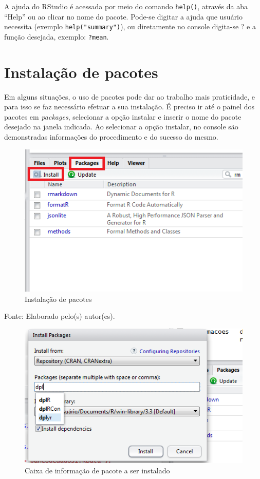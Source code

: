 \documentclass[12pt,brazil,oneside]{book}
\begin{document}
A ajuda do RStudio é acessada por meio do comando \texttt{help()}, através da aba ``Help'' ou ao clicar no nome do pacote. Pode-se digitar a ajuda que usuário necessita (exemplo \texttt{help("summary")}), ou diretamente no console digita-se ? e a função desejada, exemplo: \texttt{?mean}.

\hypertarget{instalacao-de-pacotes}{%
\section{Instalação de pacotes}\label{instalacao-de-pacotes}}

Em alguns situações, o uso de pacotes pode dar ao trabalho mais praticidade, e para isso se faz necessário efetuar a sua instalação. É preciso ir até o painel dos pacotes em \emph{packages}, selecionar a opção instalar e inserir o nome do pacote desejado na janela indicada. Ao selecionar a opção instalar, no console são demonstradas informações do procedimento e do sucesso do mesmo.

\begin{figure}[H]

{\centering \includegraphics[width=0.7\linewidth]{pacotes1} 

}

\caption{Instalação de pacotes}\label{fig:pacotes1}
\end{figure}

Fonte: Elaborado pelo(s) autor(es).

\begin{figure}[H]

{\centering \includegraphics[width=0.7\linewidth]{pacotes2} 

}

\caption{Caixa de informação de pacote a ser instalado}\label{fig:pacotes2}
\end{figure}
\end{document}
